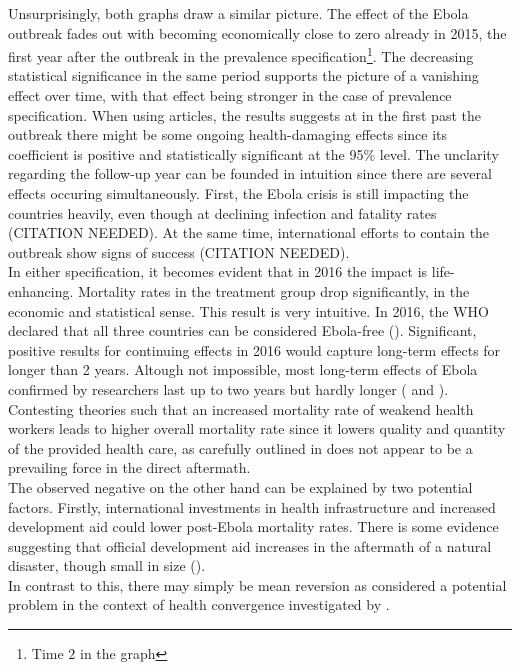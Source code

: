 \documentclass{article}
\begin{document}
Unsurprisingly, both graphs draw a similar picture. The effect of the Ebola outbreak fades out with becoming economically close to zero already in 2015, the first year after the outbreak in the prevalence specification\footnote{Time $2$ in the graph}. The decreasing statistical significance in the same period supports the picture of a vanishing effect over time, with that effect being stronger in the case of prevalence specification. When using articles, the results suggests at in the first past the outbreak there might be some ongoing health-damaging effects since its coefficient is positive and statistically significant at the 95\% level. The unclarity regarding the follow-up year can be founded in intuition since there are several effects occuring simultaneously. First, the Ebola crisis is still impacting the countries heavily, even though at declining infection and fatality rates (CITATION NEEDED). At the same time, international efforts to contain the outbreak show signs of success (CITATION NEEDED). \\
In either specification, it becomes evident that in 2016 the impact is life-enhancing. Mortality rates in the treatment group drop significantly, in the economic and statistical sense. This result is very intuitive. In 2016, the WHO declared that all three countries can be considered Ebola-free (\cite{world2016latest}). Significant, positive results for continuing effects in 2016 would capture long-term effects for longer than 2 years. Altough not impossible, most long-term effects of Ebola confirmed by researchers last up to two years but hardly longer (\cite{clark2015long} and \cite{rowe1999clinical}). Contesting theories such that an increased mortality rate of weakend health workers leads to higher overall mortality rate since it lowers quality and quantity of the provided health care, as carefully outlined in \cite{evans2015next} does not appear to be a prevailing force in the direct aftermath. \\
The observed negative  on the other hand can be explained by two potential factors. Firstly, international investments in health infrastructure and increased development aid could lower post-Ebola mortality rates. There is some evidence suggesting that official development aid increases in the aftermath of a natural disaster, though small in size (\cite{becerra2014foreign}). \\
In contrast to this, there may simply be mean reversion as considered a potential problem in the context of health convergence investigated by \cite{jayachandran2009life}. \\
\end{document}
